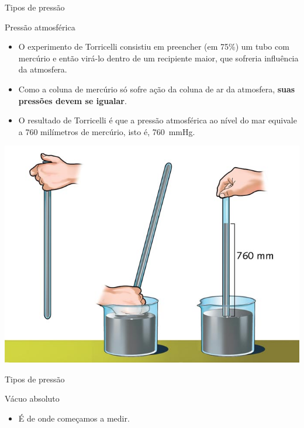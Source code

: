 \begin{frame}{Tipos de pressão}
	\begin{block}{Pressão atmosférica}
		\begin{itemize}
			\item O experimento de Torricelli consistiu em preencher (em 75\%) um tubo com mercúrio e então virá-lo dentro de um recipiente maior, que sofreria influência da atmosfera.
			\item Como a coluna de mercúrio só sofre ação da coluna de ar da atmosfera, \textbf{suas pressões devem se igualar}.
			\item O resultado de Torricelli é que a pressão atmosférica ao nível do mar equivale a \num{760} milímetros de mercúrio, isto é, \SI{760}{\mmHg}.
		\end{itemize}
	\end{block}
	
	\centering
	\includegraphics[height=0.4\textheight]{Figuras/Ch11/fig7}
\end{frame}


\begin{frame}{Tipos de pressão}
	\begin{block}{Vácuo absoluto}
		\begin{itemize}
			\item É de onde começamos a medir.
		\end{itemize}
	\end{block}
	
	\vspace{3.5cm}
	
	\centering
\end{frame}



